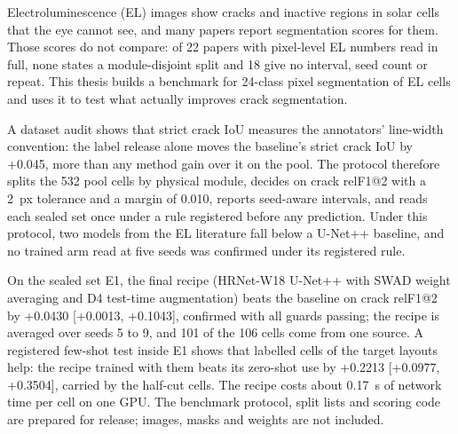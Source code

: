 Electroluminescence (EL) images show cracks and inactive regions in solar cells that the eye cannot see, and many papers report
segmentation scores for them. Those scores do not compare: of 22 papers with pixel-level EL numbers read in full, none states a
module-disjoint split and 18 give no interval, seed count or repeat. This thesis builds a benchmark for 24-class pixel segmentation
of EL cells and uses it to test what actually improves crack segmentation.

A dataset audit shows that strict crack IoU measures the annotators' line-width convention: the label release alone moves the
baseline's strict crack IoU by +0.045, more than any method gain over it on the pool. The protocol therefore splits the 532 pool
cells by physical module, decides on crack relF1@2 with a 2~px tolerance and a margin of 0.010, reports seed-aware intervals, and
reads each sealed set once under a rule registered before any prediction. Under this protocol, two models from the EL literature
fall below a U-Net++ baseline, and no trained arm read at five seeds was confirmed under its registered rule.

On the sealed set E1, the final recipe (HRNet-W18 U-Net++ with SWAD weight averaging and D4 test-time augmentation) beats the
baseline on crack relF1@2 by +0.0430 [+0.0013, +0.1043], confirmed with all guards passing; the recipe is averaged over seeds 5 to 9,
and 101 of the 106 cells come from one source. A registered few-shot test inside E1 shows that labelled cells of the target layouts
help: the recipe trained with them beats its zero-shot use by +0.2213 [+0.0977, +0.3504], carried by the half-cut cells. The recipe costs about
0.17~s of network time per cell on one GPU. The benchmark protocol, split lists and scoring code are prepared for release; images, masks and
weights are not included.
